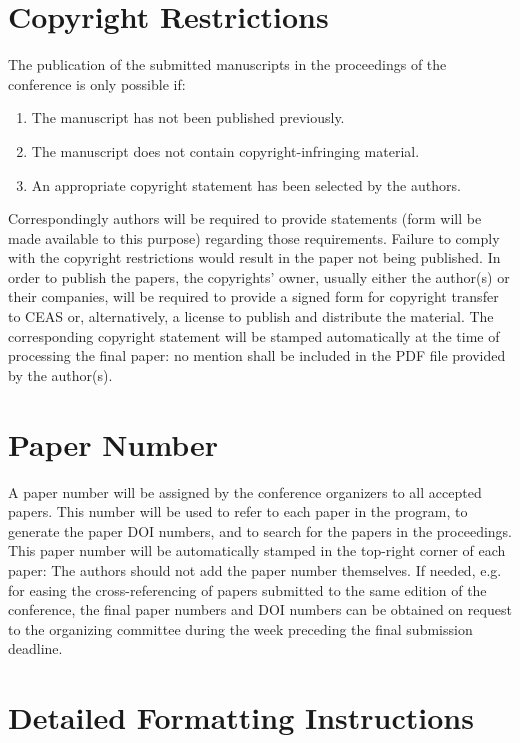 \documentclass{CEAS_EuroGNC_2024}
\begin{document}
\section{Copyright Restrictions}\label{sec:copyright_restrictions}

The publication of the submitted manuscripts in the proceedings of the conference is only possible if:
\begin{enumerate}
\item The manuscript has not been published previously.
\item The manuscript does not contain copyright-infringing material.
\item An appropriate copyright statement has been selected by the authors.
\end{enumerate}
Correspondingly authors will be required to provide statements (form will be made available to this purpose) regarding those requirements. Failure to comply with the copyright restrictions would result in the paper not being published. In order to publish the papers, the copyrights' owner, usually either the author(s) or their companies, will be required to provide a signed form for copyright transfer to CEAS or, alternatively, a license to publish and distribute the material. The corresponding copyright statement will be stamped automatically at the time of processing the final paper: no mention shall be included in the PDF file provided by the author(s).

\section{Paper Number}

A paper number will be assigned by the conference organizers to all accepted papers. This number will be used to refer to each paper in the program, to generate the paper DOI numbers, and to search for the papers in the proceedings. This paper number will be automatically stamped in the top-right corner of each paper: The authors should not add the paper number themselves. If needed, e.g. for easing the cross-referencing of papers submitted to the same edition of the conference, the final paper numbers and DOI numbers can be obtained on request to the organizing committee during the week preceding the final submission deadline. 



\section{Detailed Formatting Instructions}
\end{document}
